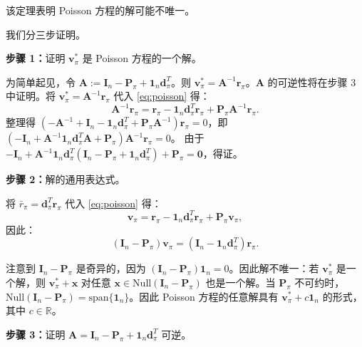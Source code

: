 \documentclass[UTF8]{article}
\begin{document}
该定理表明 Poisson 方程的解可能不唯一。

\begin{proofbox}
我们分三步证明。
\bigskip

\noindent\textbf{步骤 1：}证明 $\boldsymbol{v}_\pi^*$ 是 Poisson 方程的一个解。

为简单起见，令 $\boldsymbol{A} := \boldsymbol{I}_n - \boldsymbol{P}_\pi + \boldsymbol{1}_n \boldsymbol{d}_\pi^T$。则 $\boldsymbol{v}_\pi^* = \boldsymbol{A}^{-1} \boldsymbol{r}_\pi$。$\boldsymbol{A}$ 的可逆性将在步骤 3 中证明。将 $\boldsymbol{v}_\pi^* = \boldsymbol{A}^{-1} \boldsymbol{r}_\pi$ 代入 \eqref{eq:poisson} 得：
\[
\boldsymbol{A}^{-1} \boldsymbol{r}_\pi = \boldsymbol{r}_\pi - \boldsymbol{1}_n \boldsymbol{d}_\pi^T \boldsymbol{r}_\pi + \boldsymbol{P}_\pi \boldsymbol{A}^{-1} \boldsymbol{r}_\pi.
\]
整理得 $(-\boldsymbol{A}^{-1} + \boldsymbol{I}_n - \boldsymbol{1}_n \boldsymbol{d}_\pi^T + \boldsymbol{P}_\pi \boldsymbol{A}^{-1}) \boldsymbol{r}_\pi = 0$，即 $(-\boldsymbol{I}_n + \boldsymbol{A}^{-1} \boldsymbol{1}_n \boldsymbol{d}_\pi^T \boldsymbol{A} + \boldsymbol{P}_\pi) \boldsymbol{A}^{-1} \boldsymbol{r}_\pi = 0$。
由于 $-\boldsymbol{I}_n + \boldsymbol{A}^{-1} \boldsymbol{1}_n \boldsymbol{d}_\pi^T (\boldsymbol{I}_n - \boldsymbol{P}_\pi + \boldsymbol{1}_n \boldsymbol{d}_\pi^T) + \boldsymbol{P}_\pi = \boldsymbol{0}$，得证。

\noindent\textbf{步骤 2：}解的通用表达式。

将 $\bar{r}_\pi = \boldsymbol{d}_\pi^T \boldsymbol{r}_\pi$ 代入 \eqref{eq:poisson} 得：
\[
\boldsymbol{v}_\pi = \boldsymbol{r}_\pi - \boldsymbol{1}_n \boldsymbol{d}_\pi^T \boldsymbol{r}_\pi + \boldsymbol{P}_\pi \boldsymbol{v}_\pi,
\]
因此：
\[
(\boldsymbol{I}_n - \boldsymbol{P}_\pi) \boldsymbol{v}_\pi = (\boldsymbol{I}_n - \boldsymbol{1}_n \boldsymbol{d}_\pi^T) \boldsymbol{r}_\pi.
\]

注意到 $\boldsymbol{I}_n - \boldsymbol{P}_\pi$ 是奇异的，因为 $(\boldsymbol{I}_n - \boldsymbol{P}_\pi) \boldsymbol{1}_n = 0$。因此解不唯一：若 $\boldsymbol{v}_\pi^*$ 是一个解，则 $\boldsymbol{v}_\pi^* + \boldsymbol{x}$ 对任意 $\boldsymbol{x} \in \text{Null}(\boldsymbol{I}_n - \boldsymbol{P}_\pi)$ 也是一个解。当 $\boldsymbol{P}_\pi$ 不可约时，$\text{Null}(\boldsymbol{I}_n - \boldsymbol{P}_\pi) = \text{span}\{\boldsymbol{1}_n\}$。因此 Poisson 方程的任意解具有 $\boldsymbol{v}_\pi^* + c \boldsymbol{1}_n$ 的形式，其中 $c \in \mathbb{R}$。

\noindent\textbf{步骤 3：}证明 $\boldsymbol{A} = \boldsymbol{I}_n - \boldsymbol{P}_\pi + \boldsymbol{1}_n \boldsymbol{d}_\pi^T$ 可逆。


\end{proofbox}
\end{document}
